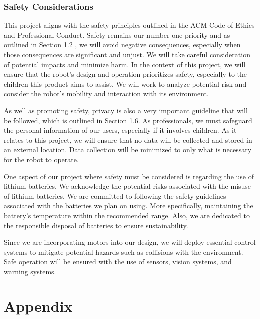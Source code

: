 \documentclass{report}
\begin{document}
    \subsection{Safety Considerations}
    This project aligns with the safety principles outlined in the ACM Code of Ethics and Professional Conduct. Safety remains our number one priority and as outlined in Section 1.2 \cite{ACM_2018}, we will avoid negative consequences, especially when those consequences are significant and unjust. We will take careful consideration of potential impacts and minimize harm. In the context of this project, we will ensure that the robot’s design and operation prioritizes safety, especially to the children this product aims to assist. We will work to analyze potential risk and consider the robot’s mobility and interaction with its environment.

    As well as promoting safety, privacy is also a very important guideline that will be followed, which is outlined in Section 1.6. As professionals, we must safeguard the personal information of our users, especially if it involves children. As it relates to this project, we will ensure that no data will be collected and stored in an external location. Data collection will be minimized to only what is necessary for the robot to operate.

    One aspect of our project where safety must be considered is regarding the use of lithium batteries. We acknowledge the potential risks associated with the misuse of lithium batteries. We are committed to following the safety guidelines associated with the batteries we plan on using. More specifically, maintaining the battery’s temperature within the recommended range. Also, we are dedicated to the responsible disposal of batteries to ensure sustainability.

    Since we are incorporating motors into our design, we will deploy essential control systems to mitigate potential hazards such as collisions with the environment. Safe operation will be ensured with the use of sensors, vision systems, and warning systems.

    \appendix

    \chapter{Appendix}
\end{document}
